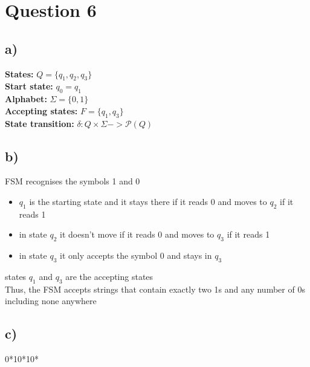 \documentclass[11pt]{article}
\begin{document}
\section*{Question 6}
\subsection*{a)}
\textbf{States:} $Q = \{q_1, q_2, q_3\}$ \\
\textbf{Start state:} $q_0 = q_1$ \\
\textbf{Alphabet:} $\Sigma = \{0, 1\}$ \\
\textbf{Accepting states:} $F = \{q_1, q_3\}$ \\
\textbf{State transition:} $\delta : Q \times \Sigma -> \mathcal{P}(Q)$ \\

\subsection*{b)}
FSM recognises the symbols 1 and 0
\begin{itemize}
    \item $q_1$ is the starting state and it stays there if it reads 0 and moves to $q_2$ if it reads 1
    \item in state $q_2$ it doesn't move if it reads 0 and moves to $q_3$ if it reads 1
    \item in state $q_3$ it only accepts the symbol 0 and stays in $q_3$
\end{itemize}
states $q_1$ and $q_3$ are the accepting states \\
Thus, the FSM accepts strings that contain exactly two 1s and any number of 0s including none anywhere

\subsection*{c)}
0*10*10*
\end{document}
